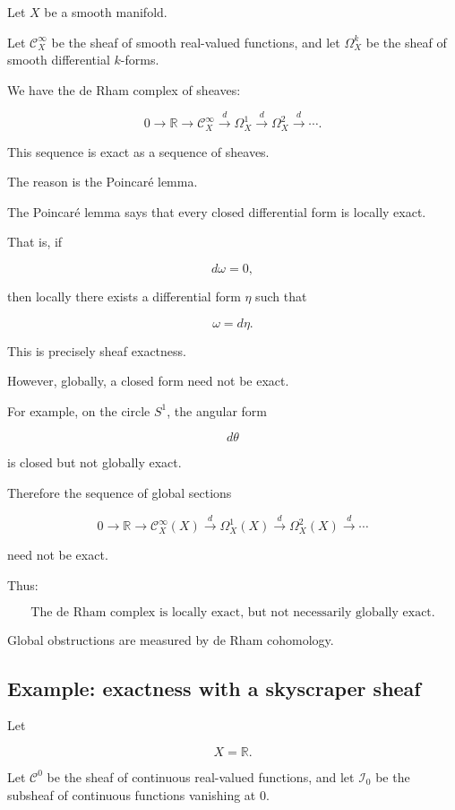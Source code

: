 \documentclass[12pt,a4paper]{article}
\theoremstyle{notespace}
\newcommand{\C}{\mathcal C}
\newcommand{\I}{\mathcal I}
\begin{document}
	Let $X$ be a smooth manifold.
	
	Let $\C^\infty_X$ be the sheaf of smooth real-valued functions, and let
	$\Omega_X^k$ be the sheaf of smooth differential $k$-forms.
	
	We have the de Rham complex of sheaves:
	
	\[
	0
	\longrightarrow
	\mathbb R
	\longrightarrow
	\C^\infty_X
	\xrightarrow{d}
	\Omega_X^1
	\xrightarrow{d}
	\Omega_X^2
	\xrightarrow{d}
	\cdots.
	\]
	
	This sequence is exact as a sequence of sheaves.
	
	The reason is the Poincaré lemma.
	
	The Poincaré lemma says that every closed differential form is locally exact.
	
	That is, if
	
	\[
	d\omega=0,
	\]
	
	then locally there exists a differential form $\eta$ such that
	
	\[
	\omega=d\eta.
	\]
	
	This is precisely sheaf exactness.
	
	However, globally, a closed form need not be exact.
	
	For example, on the circle $S^1$, the angular form
	
	\[
	d\theta
	\]
	
	is closed but not globally exact.
	
	Therefore the sequence of global sections
	
	\[
	0
	\longrightarrow
	\mathbb R
	\longrightarrow
	\C^\infty_X(X)
	\xrightarrow{d}
	\Omega_X^1(X)
	\xrightarrow{d}
	\Omega_X^2(X)
	\xrightarrow{d}
	\cdots
	\]
	
	need not be exact.
	
	Thus:
	
	\[
	\boxed{
		\text{The de Rham complex is locally exact, but not necessarily globally exact.}
	}
	\]
	
	Global obstructions are measured by de Rham cohomology.
	
	\subsection{Example: exactness with a skyscraper sheaf}
	
	Let
	
	\[
	X=\mathbb R.
	\]
	
	Let $\C^0$ be the sheaf of continuous real-valued functions, and let $\I_0$ be
	the subsheaf of continuous functions vanishing at $0$.
	
\end{document}
